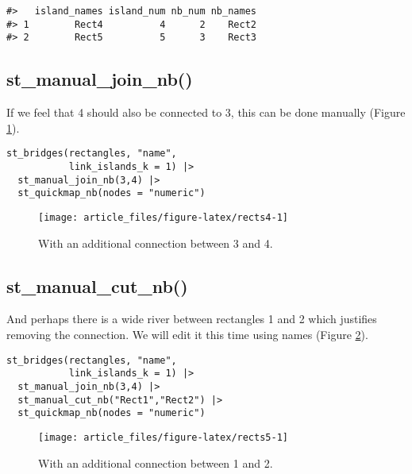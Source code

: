 \begin{verbatim}
#>   island_names island_num nb_num nb_names
#> 1        Rect4          4      2    Rect2
#> 2        Rect5          5      3    Rect3
\end{verbatim}

\hypertarget{st_manual_join_nb}{%
\subsection{st\_manual\_join\_nb()}\label{st_manual_join_nb}}

If we feel that 4 should also be connected to 3, this can be done
manually (Figure \ref{fig:rects4}).

\begin{verbatim}
st_bridges(rectangles, "name", 
           link_islands_k = 1) |> 
  st_manual_join_nb(3,4) |> 
  st_quickmap_nb(nodes = "numeric")
\end{verbatim}

\begin{figure}

{\centering \texttt{[image: article\_files/figure-latex/rects4-1]} 

}

\caption{With an additional connection between 3 and 4. }\label{fig:rects4}
\end{figure}

\hypertarget{st_manual_cut_nb}{%
\subsection{st\_manual\_cut\_nb()}\label{st_manual_cut_nb}}

And perhaps there is a wide river between rectangles 1 and 2 which
justifies removing the connection. We will edit it this time using
names (Figure \ref{fig:rects5}).

\begin{verbatim}
st_bridges(rectangles, "name", 
           link_islands_k = 1) |> 
  st_manual_join_nb(3,4) |> 
  st_manual_cut_nb("Rect1","Rect2") |> 
  st_quickmap_nb(nodes = "numeric")
\end{verbatim}

\begin{figure}

{\centering \texttt{[image: article\_files/figure-latex/rects5-1]} 

}

\caption{With an additional connection between 1 and 2. }\label{fig:rects5}
\end{figure}

